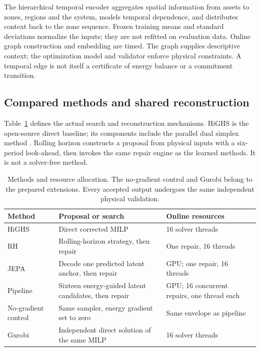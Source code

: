 The hierarchical temporal encoder aggregates spatial information from assets
to zones, regions and the system, models temporal dependence, and distributes
context back to the zone sequence. Frozen training means and standard
deviations normalize the inputs; they are not refitted on evaluation data.
Online graph construction and embedding are timed. The graph supplies
descriptive context; the optimization model and validator enforce physical
constraints. A temporal edge is not itself a certificate of energy balance
or a commitment transition.


\subsection{Compared methods and shared reconstruction}
Table~\ref{tab:methods} defines the actual search and reconstruction mechanisms.
HiGHS is the open-source direct baseline; its components include the parallel
dual simplex method \citep{huangfu2018}. Rolling horizon constructs a proposal
from physical inputs with a six-period look-ahead, then invokes the same repair
engine as the learned methods. It is not a solver-free method.

\begin{table}[htbp]\centering\small
\begin{tabular}{p{.17\linewidth}p{.42\linewidth}p{.29\linewidth}}\toprule
Method & Proposal or search & Online resources\\\midrule
HiGHS & Direct corrected MILP & 16 solver threads\\
RH & Rolling-horizon strategy, then repair & One repair, 16 threads\\
JEPA & Decode one predicted latent anchor, then repair & GPU; one repair, 16 threads\\
Pipeline & Sixteen energy-guided latent candidates, then repair & GPU; 16 concurrent repairs, one thread each\\
No-gradient control & Same sampler, energy gradient set to zero & Same envelope as pipeline\\
Gurobi & Independent direct solution of the same MILP & 16 solver threads\\\bottomrule
\end{tabular}
\caption{Methods and resource allocation. The no-gradient control and Gurobi belong to the prepared extensions. Every accepted output undergoes the same independent physical validation.}\label{tab:methods}
\end{table}


